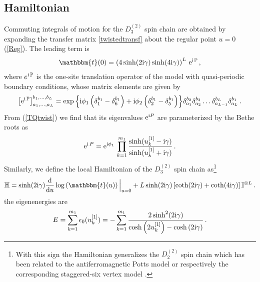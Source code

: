 \documentclass[12pt]{article}
\numberwithin{equation}{section}
\newcommand{\BR}[2]{u^{[#1]}_{#2}}
\newcommand{\ri}{{\rm i}}
\newcommand{\re}{{\rm e}}
\newcommand{\id}{\mathbb{I}}
\begin{document}
	\subsection{Hamiltonian}
	
	Commuting integrals of motion for the $D^{(2)}_3$ spin chain are obtained by expanding the transfer matrix \eqref{twistedtransf} about the regular point $u=0$ (\ref{Reg}).  The leading term is
	\begin{align}
		\mathbbm{t}(0) = \left(4\sinh(2\ri \gamma)\sinh(4\ri \gamma)\right)^L\,\re^{\ri\, \mathbb{P}} \,,
	\end{align}
	where $e^{\ri\, \mathbb{P}}$ is the one-site translation operator of the model with quasi-periodic boundary conditions, whose matrix elements are given by
	\begin{align}
		\left[\re^{\ri\, \mathbb{P}}\right]^{b_1,\dots,b_L}_{a_1,\dots,a_L}=\exp{\left\{\ri \phi_1 \left(\delta^{b_1}_1-\delta^{b_1}_6\right)+\ri \phi_2 \left(\delta^{b_1}_2-\delta^{b_1}_5\right)\right\}}\delta^{b_2}_{a_1}\delta^{b_3}_{a_2} \dots \delta^{b_L}_{a_{L-1}}\delta^{b_1}_{a_L}\,.
		\label{onesiteshift}
	\end{align}
	From (\ref{TQtwist}) we find that its eigenvalues $\re^{\ri P}$ are parameterized by the Bethe roots as
	\begin{align}
		\re^{\ri\, P}=\re^{\ri \phi_1}\,\prod^{m_1}_{k=1} \frac{\sinh(\BR{1}{k}-\ri \gamma)}{\sinh(\BR{1}{k}+\ri \gamma)} \, .
	\end{align}
	Similarly, we define the local Hamiltonian of the $D^{(2)}_3$ spin chain as\footnote{With this sign the Hamiltonian generalizes the $D^{(2)}_2$ spin chain which has been related to the antiferromagnetic Potts model \cite{RPJS20} or respectively the corresponding staggered-six vertex model \cite{NeRe21a,FrGe22} .}
	\begin{align}
		\label{eq:Hamil}
		\mathbb{H}= \sinh(2\ri \gamma) \frac{\mathrm{d}}{\mathrm{d}u} \log\left(\mathbbm{t}(u)\right)\Big\vert_{u=0} +L\sinh(2\ri \gamma)\left[\coth(2\ri \gamma)+\coth(4\ri \gamma)
		\right] \id^{\otimes L}\,.
	\end{align}
	the eigenenergies are
	\begin{align}
		E=\sum^{m_1}_{k=1} \epsilon_0(u^{[1]}_k)=-\sum^{m_1}_{k=1}\frac{2\sinh^2(2\ri \gamma)}{\cosh\left(2\BR{1}{k}\right)-\cosh\left(2\ri \gamma\right)}\,.\label{Energy}
	\end{align}
	
\end{document}
